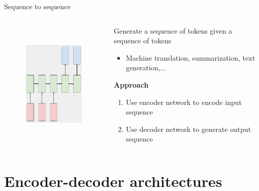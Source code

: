 \documentclass[12pt,aspectratio=169,handout]{beamer}
\begin{document}
\begin{frame}{Sequence to sequence}
	\begin{columns}[T] %
		\begin{column}{.3\textwidth}
			
			\begin{figure}[h]
				\includegraphics[height=6cm]{seq2seq.pdf}
			\end{figure}
			
		\end{column}
		\begin{column}{.7\textwidth}
			\vspace{1cm}
			Generate a sequence of tokens given a sequence of tokens
			\begin{itemize}
				\item Machine translation, summarization, text generation,...
			\end{itemize}
			\textbf{Approach}
			\begin{enumerate}
				\item Use encoder network to encode input sequence
				\item Use decoder network to generate output sequence
			\end{enumerate}
		\end{column}
	\end{columns}
	
\end{frame}





\section{Encoder-decoder architectures}
\end{document}
